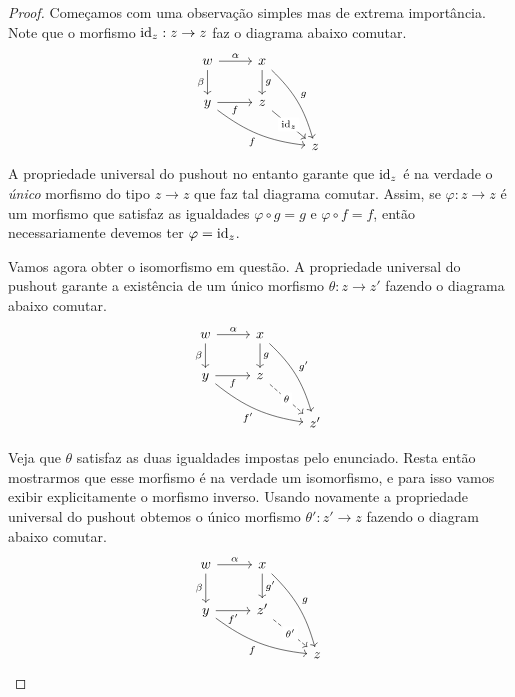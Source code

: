 \begin{proof}
    Começamos com uma observação simples mas de extrema importância.
    Note que o morfismo $\mathrm{id}_z: z \to z$ faz o diagrama abaixo comutar.
    \begin{displaymath}
        \begin{tikzcd}
            w
            \arrow[r, "\alpha"]
            \arrow[d, "\beta" swap]
            & x
            \arrow[d, "g"]
            \arrow[rdd, bend left=15, "g"]
            \\ y
            \arrow[r, "f" swap]
            \arrow[rrd, bend right=15, "f" swap]
            & z
            \arrow[rd, "\id_z" description]
            \\ & & z
        \end{tikzcd}
    \end{displaymath}
    A propriedade universal do pushout no entanto garante que $\mathrm{id}_z$ é na verdade o \emph{único} morfismo do tipo $z \to z$ que faz tal diagrama comutar.
    Assim, se $\varphi: z \to z$ é um morfismo que satisfaz as igualdades $\varphi \circ g = g$ e $\varphi \circ f = f$, então necessariamente devemos ter $\varphi = \mathrm{id}_z$.

    Vamos agora obter o isomorfismo em questão.
    A propriedade universal do pushout garante a existência de um único morfismo $\theta: z \to z'$ fazendo o diagrama abaixo comutar.
    \begin{displaymath}
        \begin{tikzcd}
            w
            \arrow[r, "\alpha"]
            \arrow[d, "\beta" swap]
            & x
            \arrow[d, "g"]
            \arrow[rdd, bend left=15, "g'"]
            \\ y
            \arrow[r, "f" swap]
            \arrow[rrd, bend right=15, "f'" swap]
            & z
            \arrow[rd, dashed, "\theta" description]
            \\ & & z'
        \end{tikzcd}
    \end{displaymath}
    
    Veja que $\theta$ satisfaz as duas igualdades impostas pelo enunciado.
    Resta então mostrarmos que esse morfismo é na verdade um isomorfismo, e para isso vamos exibir explicitamente o morfismo inverso.
    Usando novamente a propriedade universal do pushout obtemos o único morfismo $\theta': z' \to z$ fazendo o diagram abaixo comutar.
    \begin{displaymath}
        \begin{tikzcd}
            w
            \arrow[r, "\alpha"]
            \arrow[d, "\beta" swap]
            & x
            \arrow[d, "g'"]
            \arrow[rdd, bend left=15, "g"]
            \\ y
            \arrow[r, "f'" swap]
            \arrow[rrd, bend right=15, "f" swap]
            & z'
            \arrow[rd, dashed, "\theta'" description]
            \\ & & z
        \end{tikzcd}
    \end{displaymath}


\end{proof}
